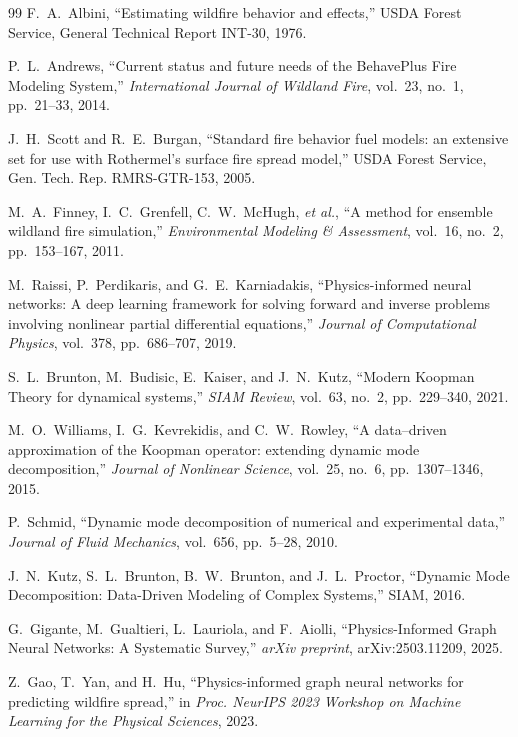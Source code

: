 \documentclass[preprint,times,numbers]{elsarticle}
\begin{document}
\begin{thebibliography}{99}
F.~A.~Albini, ``Estimating wildfire behavior and effects,'' USDA Forest Service, General Technical Report INT-30, 1976.

P.~L.~Andrews, ``Current status and future needs of the BehavePlus Fire Modeling System,'' \textit{International Journal of Wildland Fire}, vol.~23, no.~1, pp.~21--33, 2014.

J.~H.~Scott and R.~E.~Burgan, ``Standard fire behavior fuel models: an extensive set for use with Rothermel's surface fire spread model,'' USDA Forest Service, Gen. Tech. Rep. RMRS-GTR-153, 2005.

M.~A.~Finney, I.~C.~Grenfell, C.~W.~McHugh, \emph{et al.}, ``A method for ensemble wildland fire simulation,'' \textit{Environmental Modeling \& Assessment}, vol.~16, no.~2, pp.~153--167, 2011.

M.~Raissi, P.~Perdikaris, and G.~E.~Karniadakis, ``Physics-informed neural networks: A deep learning framework for solving forward and inverse problems involving nonlinear partial differential equations,'' \textit{Journal of Computational Physics}, vol.~378, pp.~686--707, 2019.

S.~L.~Brunton, M.~Budisic, E.~Kaiser, and J.~N.~Kutz, ``Modern Koopman Theory for dynamical systems,'' \textit{SIAM Review}, vol.~63, no.~2, pp.~229--340, 2021.

M.~O.~Williams, I.~G.~Kevrekidis, and C.~W.~Rowley, ``A data--driven approximation of the Koopman operator: extending dynamic mode decomposition,'' \textit{Journal of Nonlinear Science}, vol.~25, no.~6, pp.~1307--1346, 2015.

P.~Schmid, ``Dynamic mode decomposition of numerical and experimental data,'' \textit{Journal of Fluid Mechanics}, vol.~656, pp.~5--28, 2010.

J.~N.~Kutz, S.~L.~Brunton, B.~W.~Brunton, and J.~L.~Proctor, ``Dynamic Mode Decomposition: Data-Driven Modeling of Complex Systems,'' SIAM, 2016.

G.~Gigante, M.~Gualtieri, L.~Lauriola, and F.~Aiolli, ``Physics-Informed Graph Neural Networks: A Systematic Survey,'' \textit{arXiv preprint}, arXiv:2503.11209, 2025.

Z.~Gao, T.~Yan, and H.~Hu, ``Physics-informed graph neural networks for predicting wildfire spread,'' in \textit{Proc. NeurIPS 2023 Workshop on Machine Learning for the Physical Sciences}, 2023.


\end{thebibliography}
\end{document}
